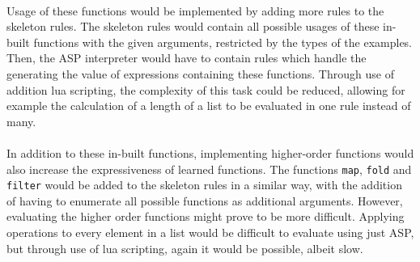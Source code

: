 \mbox{} \\
Usage of these functions would be implemented by adding more rules to the skeleton rules. The skeleton rules would contain all possible usages of these in-built functions with the given arguments, restricted by the types of the examples. Then, the ASP interpreter would have to contain rules which handle the generating the value of expressions containing these functions. Through use of addition lua scripting, the complexity of this task could be reduced, allowing for example the calculation of a length of a list to be evaluated in one rule instead of many.\\ \\
In addition to these in-built functions, implementing higher-order functions would also increase the expressiveness of learned functions. The functions \lstinline{map}, \lstinline{fold} and \lstinline{filter} would be added to the skeleton rules in a similar way, with the addition of having to enumerate all possible functions as additional arguments. However, evaluating the higher order functions might prove to be more difficult. Applying operations to every element in a list would be difficult to evaluate using just ASP, but through use of lua scripting, again it would be possible, albeit slow. %

